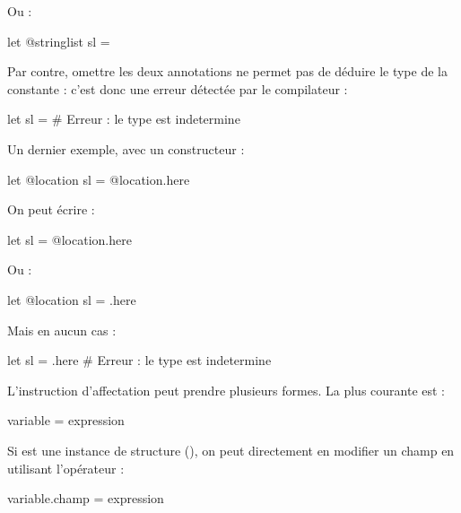 Ou :
\begin{galgascode}
let @stringlist sl = {}
\end{galgascode}

Par contre, omettre les deux annotations ne permet pas de déduire le type de la constante : c'est donc une erreur détectée par le compilateur :
\begin{galgascode}
let sl = {} # Erreur : le type est indetermine
\end{galgascode}

Un dernier exemple, avec un constructeur :
\begin{galgascode}
let @location sl = @location.here
\end{galgascode}

On peut écrire :
\begin{galgascode}
let sl = @location.here
\end{galgascode}

Ou :
\begin{galgascode}
let @location sl = .here
\end{galgascode}

Mais en aucun cas :
\begin{galgascode}
let sl = .here # Erreur : le type est indetermine
\end{galgascode}




















L'instruction d'affectation peut prendre plusieurs formes. La plus courante est :
\begin{galgascode}
variable = expression
\end{galgascode}

Si  est une instance de structure (), on peut directement en modifier un champ en utilisant l'opérateur  :
\begin{galgascode}
variable.champ = expression
\end{galgascode}

